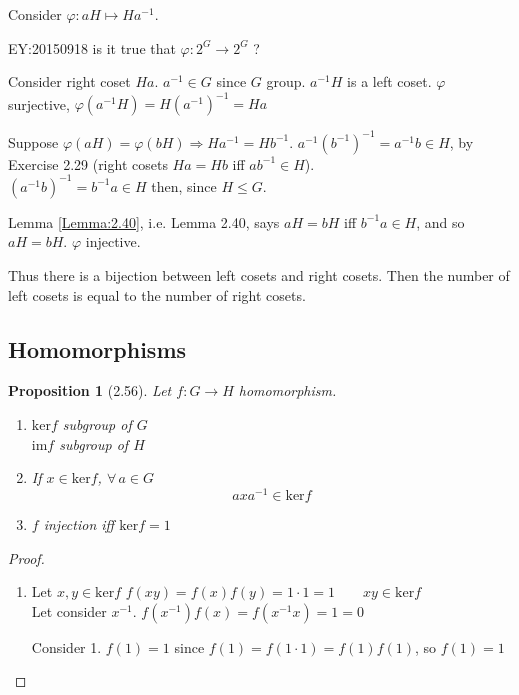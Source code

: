 \documentclass[twoside,landscape]{amsart}
\theoremstyle{plain}
\newtheorem{proposition}{Proposition}
\theoremstyle{definition}
\theoremstyle{remark}
\newcommand{\exercisehead}[1]
  { \smallskip
   \noindent{\small\bf Exercise #1.}
  }
\begin{document}
\begin{multicols*}{2}
\exercisehead{2.37} Consider $\varphi : aH \mapsto Ha^{-1}$.  

EY:20150918 is it true that $\varphi : 2^G \to 2^G$ ?

Consider right coset $Ha$.  $a^{-1} \in G$ since $G$ group.  $a^{-1}H$ is a left coset.  $\varphi$ surjective, $\varphi(a^{-1}H) = H(a^{-1})^{-1} = Ha$

Suppose $\varphi(aH) = \varphi(bH) \Longrightarrow Ha^{-1} = Hb^{-1}$.  $a^{-1}(b^{-1})^{-1} = a^{-1}b \in H$,  by Exercise 2.29 (right cosets $Ha = Hb$ iff $ab^{-1} \in H$).  \\
\phantom{\quad \, } $(a^{-1} b)^{-1} = b^{-1}a \in H$ then, since $H \leq G$.  

Lemma \ref{Lemma:2.40}, i.e. Lemma 2.40, says $aH = bH$ iff $b^{-1}a \in H$, and so $aH = bH$.  $\varphi$ injective.

Thus there is a bijection between left cosets and right cosets.  Then the number of left cosets is equal to the number of right cosets.  

\subsection{Homomorphisms}



\begin{proposition}[2.56] Let $f:G \to H$ homomorphism.  
\begin{enumerate}
\item[(i)] $\text{ker}{f}$ subgroup of $G$ \\
$\text{im}{f}$ subgroup of $H$
\item[(ii)] If $x\in \text{ker}{f}$, $\forall \, a \in G$ 
\[
axa^{-1} \in \text{ker}{f}
\]

\item[(iii)] $f$ injection iff $\text{ker}{f} = 1$
\end{enumerate}
\end{proposition}

\begin{proof}
  \begin{enumerate}
\item[(i)] Let $x,y \in \text{ker}{f} $ \quad \quad $f(xy) = f(x)f(y) = 1 \cdot 1 = 1 \quad \quad xy \in \text{ker}{f}$ \\
Let consider $x^{-1}$.  \quad \quad $f(x^{-1}) f(x) = f(x^{-1}x) = 1  = 0 $

Consider 1.  $f(1) = 1$ since $f(1) = f(1\cdot 1) = f(1) f(1)$, so $f(1) = 1$  


\end{enumerate}
\end{proof}
\end{multicols*}
\end{document}
